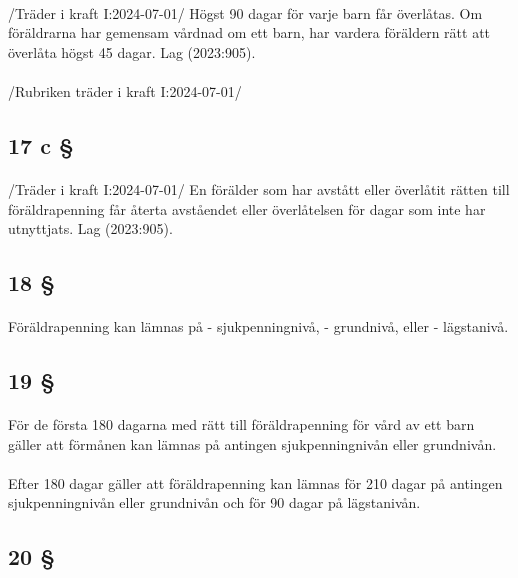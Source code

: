 \documentclass[a4paper,notitlepage,openany,10pt]{book}
\begin{document}
\paragraph*{}
/Träder i kraft I:2024-07-01/
Högst 90 dagar för varje barn får överlåtas. Om föräldrarna har gemensam vårdnad om ett barn, har vardera föräldern rätt att överlåta högst 45 dagar.
Lag (2023:905).
\paragraph*{}
/Rubriken träder i kraft I:2024-07-01/
\subsection*{17 c §}
\paragraph*{}
/Träder i kraft I:2024-07-01/
En förälder som har avstått eller överlåtit rätten till föräldrapenning får återta avståendet eller överlåtelsen för dagar som inte har utnyttjats.
Lag (2023:905).
\subsection*{18 §}
\paragraph*{}
Föräldrapenning kan lämnas på
\newline - sjukpenningnivå,
\newline - grundnivå, eller
\newline - lägstanivå.
\subsection*{19 §}
\paragraph*{}
För de första 180 dagarna med rätt till föräldrapenning för vård av ett barn gäller att förmånen kan lämnas på antingen sjukpenningnivån eller grundnivån.
\paragraph*{}
Efter 180 dagar gäller att föräldrapenning kan lämnas för 210 dagar på antingen sjukpenningnivån eller grundnivån och för 90 dagar på lägstanivån.
\subsection*{20 §}
\end{document}
